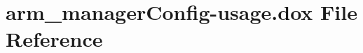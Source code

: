 \section{arm\-\_\-manager\-Config-\/usage.dox \-File \-Reference}
\label{arm__managerConfig-usage_8dox}
